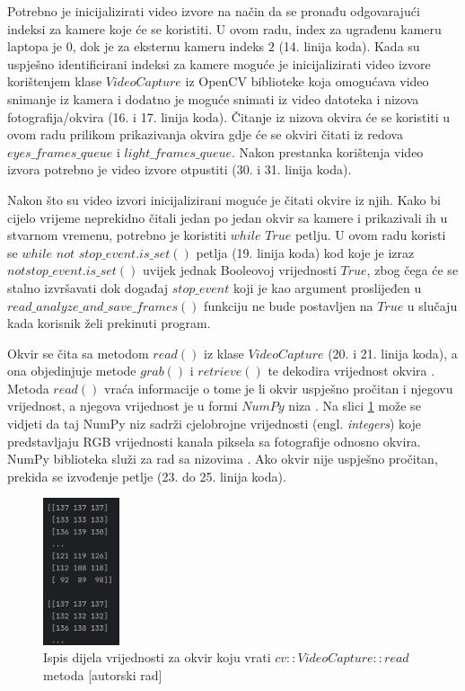 \documentclass{foi}
\begin{document}
Potrebno je inicijalizirati video izvore na način da se pronađu odgovarajući indeksi za kamere koje će se koristiti. U ovom radu, index za ugrađenu kameru laptopa je $0$, dok je za eksternu kameru indeks $2$ (14. linija koda). Kada su uspješno identificirani indeksi za kamere moguće je inicijalizirati video izvore korištenjem klase $VideoCapture$ iz OpenCV biblioteke koja omogućava video snimanje iz kamera i dodatno je moguće snimati iz video datoteka i nizova fotografija/okvira \cite{OpenCV2} (16. i 17. linija koda). Čitanje iz nizova okvira će se koristiti u ovom radu prilikom prikazivanja okvira gdje će se okviri čitati iz redova $eyes\_frames\_queue$ i $light\_frames\_queue$. Nakon prestanka korištenja video izvora potrebno je video izvore otpustiti (30. i 31. linija koda).

Nakon što su video izvori  inicijalizirani moguće je čitati okvire iz njih. Kako bi cijelo vrijeme neprekidno čitali jedan po jedan okvir sa kamere i prikazivali ih u stvarnom vremenu, potrebno je koristiti $while$ $True$ petlju. U ovom radu koristi se $while$ $not$ $stop\_event.is\_set()$ petlja (19. linija koda) kod koje je izraz $not stop\_event.is\_set()$ uvijek jednak Booleovoj vrijednosti $True$, zbog čega će se stalno izvršavati dok događaj $stop\_event$ koji je kao argument proslijeđen u $read\_analyze\_and\_save\_frames()$ funkciju ne bude postavljen na $True$ u slučaju kada korisnik želi prekinuti program.

Okvir se čita sa metodom $read()$ iz klase $VideoCapture$ (20. i 21. linija koda), a ona objedinjuje metode $grab()$ i $retrieve()$ te dekodira vrijednost okvira \cite{OpenCV2}. Metoda $read()$ vraća informacije o tome je li okvir uspješno pročitan i njegovu vrijednost, a njegova vrijednost je u formi $NumPy$ niza \cite{Reshma2023}. Na slici \ref{fig:ispis_okvira} može se vidjeti da taj NumPy niz sadrži cjelobrojne vrijednosti (engl. \emph{integers}) koje predstavljaju RGB vrijednosti kanala piksela sa fotografije odnosno okvira. NumPy biblioteka služi za rad sa nizovima \cite{NumPy}. Ako okvir nije uspješno pročitan, prekida se izvođenje petlje (23. do 25. linija koda).

\begin{figure}[h!]
    \centering
    \includegraphics[width=0.2\textwidth]{slike/numpy_frame}
    \caption{Ispis dijela vrijednosti za okvir koju vrati $cv::VideoCapture::read$ metoda [autorski rad]}
    \label{fig:ispis_okvira}
\end{figure}
\end{document}
